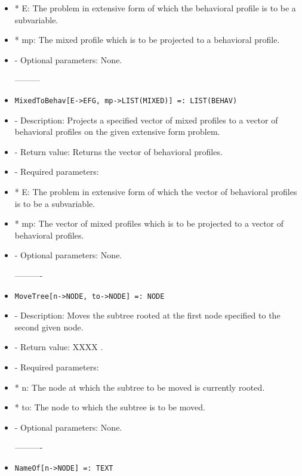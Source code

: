 \begin{itemize}
\bd
\item
*  E:  The problem in extensive form of which the behavioral profile
is to be a subvariable.
\item
*  mp:  The mixed profile which is to be projected to a behavioral
profile.
\ed

\item
- Optional parameters:  None.
\ed

---------
\item
\begin{verbatim}
MixedToBehav[E->EFG, mp->LIST(MIXED)] =: LIST(BEHAV)
\end{verbatim}

\bd
\item
- Description:  Projects a specified vector of mixed profiles to a vector
of behavioral profiles on the given extensive form problem.
\item
- Return value:  Returns the vector of behavioral profiles.
\item
- Required parameters:

\bd
\item
*  E:  The problem in extensive form of which the vector of 
behavioral profiles is to be a subvariable.
\item
*  mp:  The vector of mixed profiles which is to be projected to a 
vector of behavioral profiles.
\ed

\item
- Optional parameters:  None.
\ed

----------
\item
\begin{verbatim}
MoveTree[n->NODE, to->NODE] =: NODE
\end{verbatim}

\bd
\item
- Description:  Moves the subtree rooted at the first node specified to
the second given node.
\item
- Return value:  XXXX .
\item
- Required parameters:
	  
\bd
\item
*  n:  The node at which the subtree to be moved is currently rooted.
\item
*  to:  The node to which the subtree is to be moved.
\ed

\item
- Optional parameters:  None.
\ed

----------
\item
\begin{verbatim}
NameOf[n->NODE] =: TEXT
\end{verbatim}


\end{itemize}

